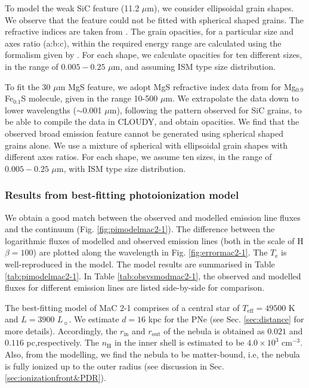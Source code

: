 \documentclass[a4paper,fleqn,usenatbib]{mnras}
\begin{document}
To model the weak SiC feature (11.2 $\mu$m), we consider ellipsoidal grain shapes. We observe that the feature could not be fitted with spherical shaped grains. The refractive indices are taken from \citet{1993ApJ...402..441L}. The grain opacities, for a particular size and axes ratio (a:b:c), within the required energy range are calculated using the formalism given by \citet{1983aslsp.book.....B}. For each shape, we calculate opacities for ten different sizes, in the range of $0.005-0.25$ $\mu$m, and assuming ISM type size distribution. 

To fit the 30 $\mu$m MgS feature, we adopt MgS refractive index data from \citet{1994ApJ...423L..71B} for Mg$_{0.9}$Fe$_{0.1}$S molecule, given in the range 10-500 $\mu$m. We extrapolate the data down to lower wavelengths ($\sim$0.001 $\mu$m), following the pattern observed for SiC grains, to be able to compile the data in CLOUDY, and obtain opacities. We find that the observed broad emission feature cannot be generated using spherical shaped grains alone. We use a mixture of spherical with ellipsoidal grain shapes with different axes ratios. For each shape, we assume ten sizes, in the range of $0.005-0.25$ $\mu$m, with ISM type size distribution. 

\subsubsection{Results from best-fitting photoionization model} \label{sec:bestmodelmac2-1}
We obtain a good match between the observed and modelled emission line fluxes and the continuum (Fig. \ref{fig:pimodelmac2-1}). The difference between the logarithmic fluxes of modelled and observed emission lines (both in the scale of H$\beta=100$) are plotted along the wavelength in Fig. \ref{fig:errormac2-1}. The $T_\mathrm{e}$ is well-reproduced in the model. The model results are summarised in Table \ref{tab:pimodelmac2-1}. In Table \ref{tab:obsvsmodmac2-1}, the observed and modelled fluxes for different emission lines are listed side-by-side for comparison. 

The best-fitting model of MaC 2-1 comprises of a central star of $T_\mathrm{eff}=49500$ K and $L=3900$ $L_{\sun}$. We estimate $d=16$ kpc for the PNe (see Sec. \ref{sec:distance} for more details). Accordingly, the $r_\mathrm{in}$ and $r_\mathrm{out}$ of the nebula is obtained as $0.021$ and $0.116$ pc,respectively. The $n_\mathrm{H}$ in the inner shell is estimated to be $4.0\times10^3$ $\mathrm{cm^{-3}}$. Also, from the modelling, we find the nebula to be matter-bound, i.e, the nebula is fully ionized up to the outer radius (see discussion in Sec. \ref{sec:ionizationfront&PDR}).
\end{document}
